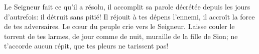Le Seigneur fait ce qu’il a résolu,
	il accomplit sa parole décrétée depuis les jours d’autrefois:
	il détruit sans pitié!
Il réjouit à tes dépens l’ennemi, il accroît la force de tes adversaires.
Le cœur du peuple crie vers le Seigneur.
Laisse couler le torrent de tes larmes, de jour comme de nuit,
	muraille de la fille de Sion;
	ne t’accorde aucun répit, que tes pleurs ne tarissent pas!
